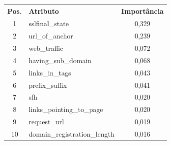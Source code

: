 \begin{tabular}{clc}
\hline
\textbf{Pos.} & \textbf{Atributo} & \textbf{Importância} \\
\hline
    1 & sslfinal_state & 0{,}329 \\
    2 & url_of_anchor & 0{,}239 \\
    3 & web_traffic & 0{,}072 \\
    4 & having_sub_domain & 0{,}068 \\
    5 & links_in_tags & 0{,}043 \\
    6 & prefix_suffix & 0{,}041 \\
    7 & sfh & 0{,}020 \\
    8 & links_pointing_to_page & 0{,}020 \\
    9 & request_url & 0{,}019 \\
    10 & domain_registration_length & 0{,}016 \\
\hline
\end{tabular}
